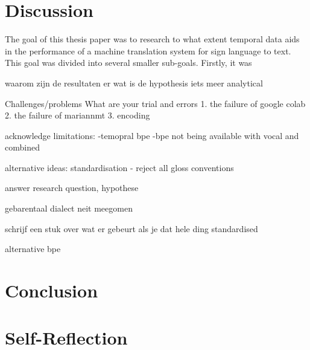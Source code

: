 \section{Discussion}

The goal of this thesis paper was to research to what extent temporal data aids in the performance of a machine translation system for sign language to text. This goal was divided into several smaller sub-goals. Firstly, it was

waarom zijn de resultaten er wat is de hypothesis iets meer analytical

Challenges/problems
What are your trial and errors
1. the failure of google colab
2. the failure of mariannmt
3. encoding

acknowledge limitations:
-temopral bpe
-bpe not being available with vocal and combined


alternative ideas:
standardisation - reject all gloss conventions


answer research question, hypothese

gebarentaal dialect neit meegomen

schrijf een stuk over wat er gebeurt als je dat hele ding standardised

alternative bpe




\section{Conclusion}


\section{Self-Reflection}

